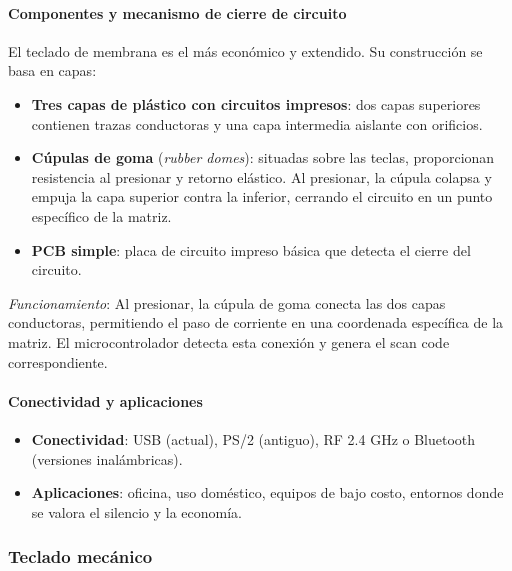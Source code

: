 \documentclass[12pt, letterpaper]{article}
\begin{document}
\paragraph{Componentes y mecanismo de cierre de circuito}
El teclado de membrana es el más económico y extendido. Su construcción se basa en capas:
\begin{itemize}
    \item \textbf{Tres capas de plástico con circuitos impresos}: dos capas superiores contienen trazas conductoras y una capa intermedia aislante con orificios.
    \item \textbf{Cúpulas de goma} (\textit{rubber domes}): situadas sobre las teclas, proporcionan resistencia al presionar y retorno elástico. Al presionar, la cúpula colapsa y empuja la capa superior contra la inferior, cerrando el circuito en un punto específico de la matriz.
    \item \textbf{PCB simple}: placa de circuito impreso básica que detecta el cierre del circuito.
\end{itemize}
\textit{Funcionamiento}: Al presionar, la cúpula de goma conecta las dos capas conductoras, permitiendo el paso de corriente en una coordenada específica de la matriz. El microcontrolador detecta esta conexión y genera el scan code correspondiente.

\paragraph{Conectividad y aplicaciones}
\begin{itemize}
    \item \textbf{Conectividad}: USB (actual), PS/2 (antiguo), RF 2.4 GHz o Bluetooth (versiones inalámbricas).
    \item \textbf{Aplicaciones}: oficina, uso doméstico, equipos de bajo costo, entornos donde se valora el silencio y la economía.
\end{itemize}

\subsubsection{Teclado mecánico}
\end{document}
